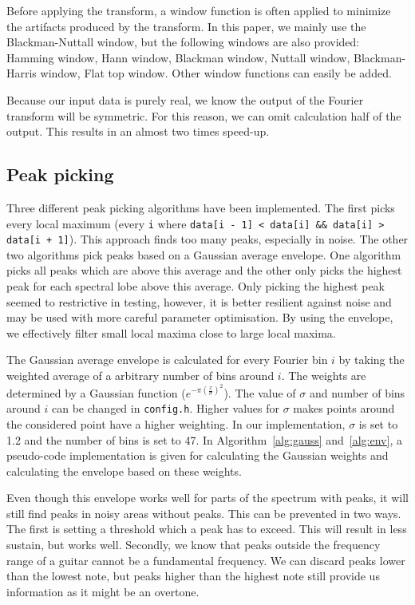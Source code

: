 \documentclass[10pt,twocolumn]{article}
\begin{document}
Before applying the transform, a window function is often applied to minimize the artifacts produced by the transform. In this paper, we mainly use the Blackman-Nuttall window, but the following windows are also provided: Hamming window, Hann window, Blackman window, Nuttall window, Blackman-Harris window, Flat top window. Other window functions can easily be added.

Because our input data is purely real, we know the output of the Fourier transform will be symmetric. For this reason, we can omit calculation half of the output. This results in an almost two times speed-up\cite{twotimes}.

\subsection{Peak picking} \label{sub:peak}
Three different peak picking algorithms have been implemented. The first picks every local maximum (every \texttt{i} where \texttt{data[i - 1] < data[i] \&\& data[i] > data[i + 1]}). This approach finds too many peaks, especially in noise. The other two algorithms pick peaks based on a Gaussian average envelope. One algorithm picks all peaks which are above this average and the other only picks the highest peak for each spectral lobe above this average. Only picking the highest peak seemed to restrictive in testing, however, it is better resilient against noise and may be used with more careful parameter optimisation. By using the envelope, we effectively filter small local maxima close to large local maxima.

The Gaussian average envelope is calculated for every Fourier bin $i$ by taking the weighted average of a arbitrary number of bins around $i$. The weights are determined by a Gaussian function ($e^{-\pi(\frac{x}{\sigma})^2}$). The value of $\sigma$ and number of bins around $i$ can be changed in \texttt{config.h}. Higher values for $\sigma$ makes points around the considered point have a higher weighting. In our implementation, $\sigma$ is set to 1.2 and the number of bins is set to 47. In Algorithm~\ref{alg:gauss} and~\ref{alg:env}, a pseudo-code implementation is given for calculating the Gaussian weights and calculating the envelope based on these weights.



Even though this envelope works well for parts of the spectrum with peaks, it will still find peaks in noisy areas without peaks. This can be prevented in two ways. The first is setting a threshold which a peak has to exceed. This will result in less sustain, but works well. Secondly, we know that peaks outside the frequency range of a guitar cannot be a fundamental frequency. We can discard peaks lower than the lowest note, but peaks higher than the highest note still provide us information as it might be an overtone.
\end{document}
